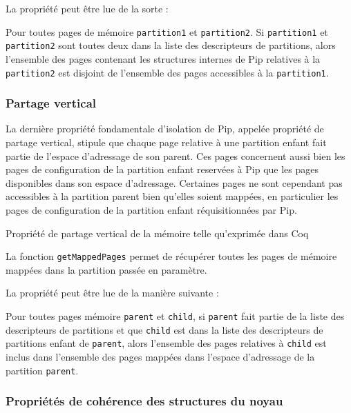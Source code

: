 			La propriété peut être lue de la sorte :
			\begin{property}
				Pour toutes pages de mémoire \texttt{partition1} et \texttt{partition2}. Si \texttt{partition1} et \texttt{partition2} sont toutes deux dans la liste des descripteurs de partitions, alors l'ensemble des pages contenant les structures internes de Pip relatives à la \texttt{partition2} est disjoint de l'ensemble des pages accessibles à la \texttt{partition1}.
			\end{property}

			\subsubsection{Partage vertical}

			La dernière propriété fondamentale d'isolation de Pip, appelée propriété de partage vertical, stipule que chaque page relative à une partition enfant fait partie de l'espace d'adressage de son parent. Ces pages concernent aussi bien les pages de configuration de la partition enfant reservées à Pip que les pages disponibles dans son espace d'adressage. Certaines pages ne sont cependant pas accessibles à la partition parent bien qu'elles soient mappées, en particulier les pages de configuration de la partition enfant réquisitionnées par Pip.

			\begin{listing}[!ht]
				\caption{Propriété de partage vertical de la mémoire telle qu'exprimée dans Coq}
				\label{code:vertical_sharing}
			\end{listing}

			La fonction \texttt{getMappedPages} permet de récupérer toutes les pages de mémoire mappées dans la partition passée en paramètre.

			La propriété peut être lue de la manière suivante :

			\begin{property}
				Pour toutes pages mémoire \texttt{parent} et \texttt{child}, si \texttt{parent} fait partie de la liste des descripteurs de partitions et que \texttt{child} est dans la liste des descripteurs de partitions enfant de \texttt{parent}, alors l'ensemble des pages relatives à \texttt{child} est inclus dans l'ensemble des pages mappées dans l'espace d'adressage de la partition \texttt{parent}.
			\end{property}

			\subsubsection{Propriétés de cohérence des structures du noyau}

